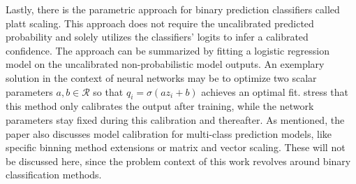 Lastly, there is the parametric approach for binary prediction classifiers called platt scaling. This approach does not require the uncalibrated predicted probability and solely utilizes 
the classifiers' logits to infer a calibrated confidence. The approach can be summarized by fitting a logistic regression model on the uncalibrated non-probabilistic model outputs. An exemplary 
solution in the context of neural networks may be to optimize two scalar parameters $a, b \in \mathcal{R}$ so that $\hat{q}_i = \sigma(az_i + b)$ achieves an optimal fit. \cite{Guo_2017_tempscalingetc} 
stress that this method only calibrates the output after training, while the network parameters stay fixed during this calibration and thereafter.
\newline
As mentioned, the paper also discusses model calibration for multi-class prediction models, like specific binning method extensions or matrix and vector scaling. These will not be discussed here, 
since the problem context of this work revolves around binary classification methods.


